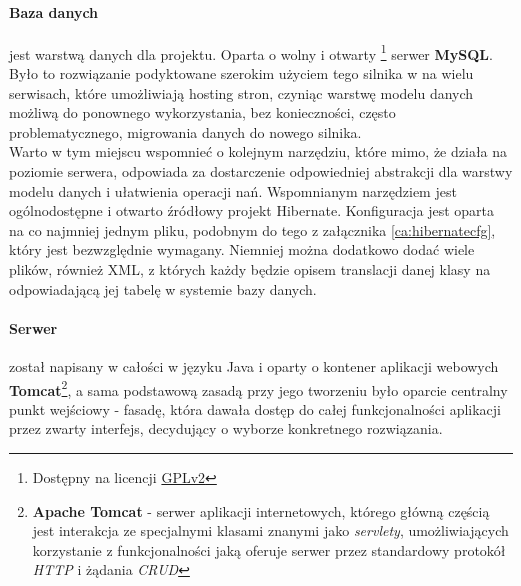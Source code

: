 		\paragraph{Baza danych} jest warstwą danych dla projektu. Oparta o wolny i otwarty \footnote{
			Dostępny na licencji \href{http://www.gnu.org/licenses/old-licenses/gpl-2.0.html}{GPLv2}
		}
			serwer \textbf{MySQL}. Było to rozwiązanie podyktowane szerokim użyciem tego silnika w 
			na wielu serwisach, które umożliwiają hosting stron, czyniąc warstwę modelu danych możliwą
			do ponownego wykorzystania, bez konieczności, często problematycznego, migrowania danych do
			nowego silnika. \\
			Warto w tym miejscu wspomnieć o kolejnym narzędziu, które mimo, że działa na poziomie serwera, 
			odpowiada za dostarczenie odpowiedniej abstrakcji dla warstwy modelu danych i ułatwienia
			operacji nań. Wspomnianym narzędziem jest ogólnodostępne i otwarto źródłowy projekt Hibernate. 
			Konfiguracja jest oparta na co najmniej jednym pliku, podobnym do tego z załącznika \ref{ca:hibernatecfg},
			który jest bezwzględnie wymagany. Niemniej można dodatkowo dodać wiele plików, również XML, z których
			każdy będzie opisem translacji danej klasy na odpowiadającą jej tabelę w systemie bazy danych. 
		\paragraph{Serwer} został napisany w całości w języku Java i oparty o kontener aplikacji webowych 
			\textbf{Tomcat}\footnote{
				\textbf{Apache Tomcat} - serwer aplikacji internetowych, którego główną częścią jest interakcja
				ze specjalnymi klasami znanymi jako \textit{servlety}, umożliwiających korzystanie z funkcjonalności
				jaką oferuje serwer przez standardowy protokół \textit{HTTP} i żądania \textit{CRUD}		
			}, a sama podstawową zasadą przy jego tworzeniu było oparcie centralny punkt wejściowy - fasadę, która dawała
			dostęp do całej funkcjonalności aplikacji przez zwarty interfejs, decydujący o wyborze konkretnego rozwiązania.
			
